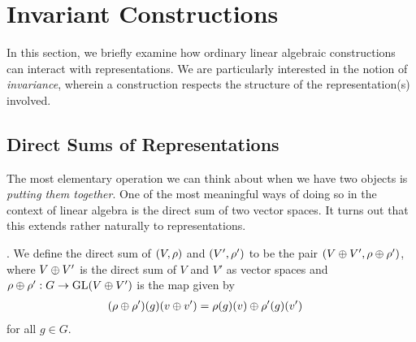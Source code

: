\section{Invariant Constructions}

In this section, we briefly examine how ordinary linear algebraic constructions can interact with representations. We are particularly interested in the notion of \textit{invariance}, wherein a construction respects the structure of the representation(s) involved.

\subsection{Direct Sums of Representations}

The most elementary operation we can think about when we have two objects is \textit{putting them together}. One of the most meaningful ways of doing so in the context of linear algebra is the direct sum of two vector spaces. It turns out that this extends rather naturally to representations.

\begin{boxdefinition}
    . We define the direct sum of $\left( V,\rho \right)$ and $\left( V', \rho' \right)$ to be the pair $\left( V \oplus V', \rho \oplus \rho' \right)$, where $V \oplus V'$ is the direct sum of $V$ and $V'$ as vector spaces and $\rho \oplus \rho' : G \to \operatorname{GL}\!\left( V \oplus V' \right)$ is the map given by
    \begin{align*}
        \left( \rho \oplus \rho' \right)\!\left( g \right)\!\left( v \oplus v' \right) &= \rho(g)(v) \oplus \rho'(g)(v')
    \end{align*}
    for all $g \in G$.
\end{boxdefinition}

